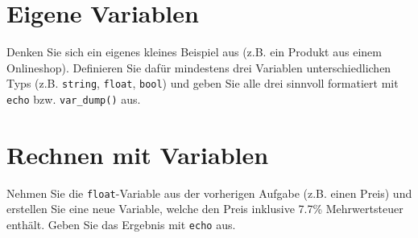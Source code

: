 \documentclass[a4paper,12pt]{article}
\begin{document}
\section{Eigene Variablen}

Denken Sie sich ein eigenes kleines Beispiel aus (z.B. ein Produkt aus einem Onlineshop). Definieren Sie dafür mindestens drei Variablen unterschiedlichen Typs (z.B. \texttt{string}, \texttt{float}, \texttt{bool}) und geben Sie alle drei sinnvoll formatiert mit \texttt{echo} bzw. \texttt{var\_dump()} aus.

\section{Rechnen mit Variablen}

Nehmen Sie die \texttt{float}-Variable aus der vorherigen Aufgabe (z.B. einen Preis) und erstellen Sie eine neue Variable, welche den Preis inklusive 7.7\% Mehrwertsteuer enthält. Geben Sie das Ergebnis mit \texttt{echo} aus.
\end{document}
